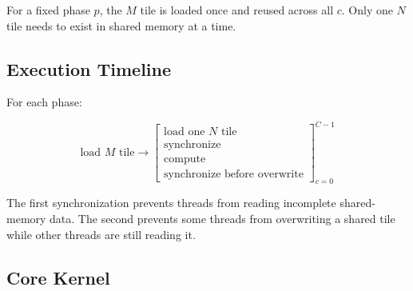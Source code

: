 \documentclass[11pt]{article}
\begin{document}
For a fixed phase \(p\), the \(M\) tile is loaded once and reused across all \(c\). Only one \(N\) tile needs to exist in shared memory at a time.

\subsection{Execution Timeline}

For each phase:

\[
\boxed{
\text{load }M\text{ tile}
\rightarrow
\left[
\begin{array}{c}
\text{load one }N\text{ tile}\\
\text{synchronize}\\
\text{compute}\\
\text{synchronize before overwrite}
\end{array}
\right]_{c=0}^{C-1}
}
\]

The first synchronization prevents threads from reading incomplete shared-memory data. The second prevents some threads from overwriting a shared tile while other threads are still reading it.

\subsection{Core Kernel}
\end{document}
